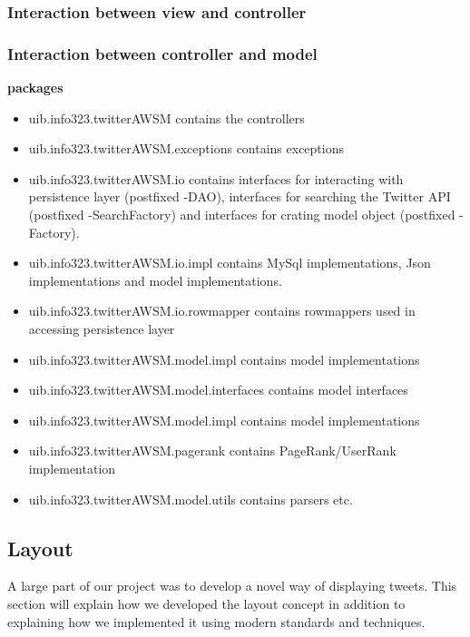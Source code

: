 \subsubsection{Interaction between view and controller} %

\subsubsection{Interaction between controller and model} %
{\bf packages}
\begin{itemize}
  \item uib.info323.twitterAWSM contains the controllers
  \item uib.info323.twitterAWSM.exceptions contains exceptions
  \item uib.info323.twitterAWSM.io contains interfaces for interacting with persistence layer (postfixed -DAO), interfaces for searching the Twitter API (postfixed -SearchFactory) and interfaces for crating model object (postfixed -Factory).
  \item uib.info323.twitterAWSM.io.impl contains MySql implementations, Json implementations and model implementations. 
  \item uib.info323.twitterAWSM.io.rowmapper contains rowmappers used in accessing persistence layer
  \item uib.info323.twitterAWSM.model.impl contains model implementations
  \item uib.info323.twitterAWSM.model.interfaces contains model interfaces
  \item uib.info323.twitterAWSM.model.impl contains model implementations
  \item uib.info323.twitterAWSM.pagerank contains PageRank/UserRank implementation
  \item uib.info323.twitterAWSM.model.utils contains parsers etc.
\end{itemize}


\subsection{Layout} %
A large part of our project was to develop a novel way of displaying tweets. This section will explain how we developed the layout concept in addition to explaining how we implemented it using modern standards and techniques.

